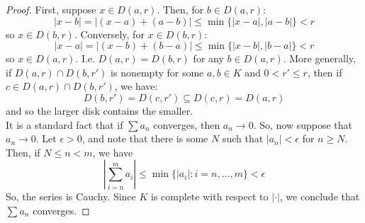 \begin{proof}
	First, suppose $x \in D(a,r)$. Then, for $b \in D(a,r)$:
	\[ |x-b| = |(x-a)+(a-b)| \leq \min\{|x-a|,|a-b|\} < r \]
	so $x \in D(b,r)$. Conversely, for $x \in D(b,r)$:
	\[ |x-a| = |(x-b)+(b-a)| \leq \min\{|x-b|,|b-a|\} < r \]
	so $x \in D(a,r)$. I.e. $D(a,r) = D(b,r)$ for any $b \in D(a,r)$. More generally, if $D(a,r) \cap D(b,r')$ is nonempty for some $a,b \in K$ and $0 < r' \leq r$, then if $c \in D(a,r) \cap D(b,r')$, we have:
	\[ D(b,r') = D(c,r') \subseteq D(c,r) = D(a,r) \]
	and so the larger disk contains the smaller. \\
	
	It is a standard fact that if $\sum a_n$ converges, then $a_n \to 0$. So, now suppose that $a_n \to 0$. Let $\epsilon > 0$, and note that there is some $N$ such that $|a_n| < \epsilon$ for $n \geq N$. Then, if $N \leq n < m$, we have
	\[ \left|\sum_{i=n}^m a_i\right| \leq \min\{|a_i| : i=n,\ldots,m\} < \epsilon \]
	So, the series is Cauchy. Since $K$ is complete with respect to $|\cdot|$, we conclude that $\sum a_n$ converges.
\end{proof}
